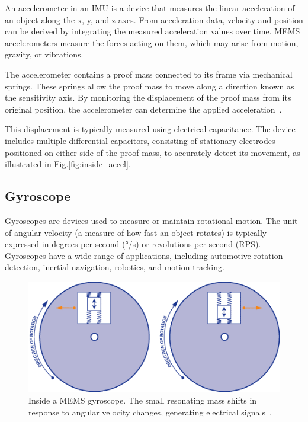 \documentclass[english, bachelor, utf8]{base/thesis_telematics}
\begin{document}
An accelerometer in an IMU is a device that measures the linear acceleration of an object along the x, y, and z axes. From acceleration data, velocity and position can be derived by integrating the measured acceleration values over time. MEMS accelerometers measure the forces acting on them, which may arise from motion, gravity, or vibrations.

The accelerometer contains a proof mass connected to its frame via mechanical springs. These springs allow the proof mass to move along a direction known as the sensitivity axis. By monitoring the displacement of the proof mass from its original position, the accelerometer can determine the applied acceleration~\cite{ericco_mems_accel_vibrations}.

This displacement is typically measured using electrical capacitance. The device includes multiple differential capacitors, consisting of stationary electrodes positioned on either side of the proof mass, to accurately detect its movement, as illustrated in Fig.\ref{fig:inside_accel}.

\subsection{Gyroscope}

Gyroscopes are devices used to measure or maintain rotational motion.
The unit of angular velocity (a measure of how fast an object rotates) is typically expressed in degrees per second (°/s) or revolutions per second (RPS). 
Gyroscopes have a wide range of applications, including automotive rotation detection, inertial navigation, robotics, and motion tracking.

\begin{figure}[ht]
\centering
\includegraphics[width=\columnwidth]{pics/inside_gyro.png}
\caption{Inside a MEMS gyroscope. The small resonating mass shifts in response to angular velocity changes, generating electrical signals~\cite{sparkfun_gyroscope}.}
\label{fig:inside_gyro}
\end{figure}
\end{document}
